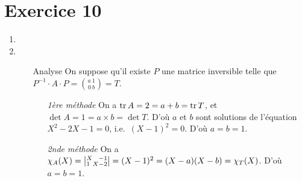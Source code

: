 \section{Exercice 10}
\begin{enumerate}
	\item
	\item
		\begin{itemize}
			\item[\sc Analyse] On suppose qu'il existe $P$\/ une matrice inversible telle que $P^{-1}\cdot A\cdot P = {a\:1\choose 0\:b} = T$.
				\begin{enumerate}
					\item[\it 1ère méthode] On a $\operatorname{tr} A = 2 = a + b = \operatorname{tr} T$, et $\det A = 1 = a \times  b = \det T$. D'où $a$\/ et $b$\/ sont solutions de l'équation $X^2 - 2X - 1 = 0$, i.e.\ $(X-1)^2 = 0$. D'où $a = b = 1$.
					\item[\it 2nde méthode] On a $\chi_A(X) =\left|\substack{X\hfill\ -1\\1\ \hfill X - 2}\right| = (X-1)^2 = (X-a)(X-b) = \chi_T(X)$. D'où $a = b = 1$.
				\end{enumerate}
		\end{itemize}
\end{enumerate}

